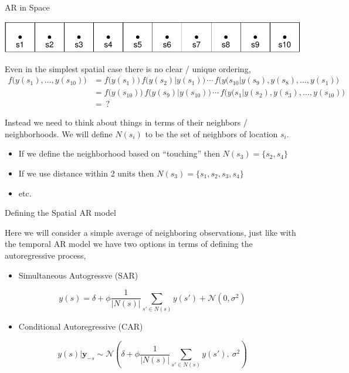 \documentclass[11pt,ignorenonframetext,]{beamer}
\providecommand{\tightlist}{%
  \setlength{\itemsep}{0pt}\setlength{\parskip}{0pt}}
\begin{document}
\begin{frame}[t]{AR in Space}

\vspace{4mm}

\includegraphics{Lec18_files/figure-beamer/unnamed-chunk-7-1.pdf}

\pause

Even in the simplest spatial case there is no clear / unique ordering,
\footnotesize
\[ \begin{aligned}
f\big(y(s_1), \ldots, y(s_{10})\big) 
  &= f\big(y(s_1)\big) \, f\big(y(s_2) | y(s_1)\big) \, \cdots \, f\big(y(s_{10} | y(s_{9}),y(s_{8}),\ldots,y(s_1)\big)  \\
  &= f\big(y(s_{10})\big) \, f\big(y(s_9) | y(s_{10})\big) \, \cdots \, f\big(y(s_{1} | y(s_{2}),y(s_{3}),\ldots,y(s_{10})\big)  \\
  &= ~?
\end{aligned} \] \normalsize

\pause

Instead we need to think about things in terms of their neighbors /
neighborhoods. We will define \(N(s_i)\) to be the set of neighbors of
location \(s_i\).

\begin{itemize}
\item
  If we define the neighborhood based on ``touching'' then
  \(N(s_3) = \{s_2, s_4\}\)
\item
  If we use distance within 2 units then
  \(N(s_3) = \{s_1,s_2,s_3,s_4\}\)
\item
  etc.
\end{itemize}

\end{frame}

\begin{frame}[t]{Defining the Spatial AR model}

Here we will consider a simple average of neighboring observations, just
like with the temporal AR model we have two options in terms of defining
the autoregressive process,

\begin{itemize}
\tightlist
\item
  Simultaneous Autogressve (SAR)
\end{itemize}

\[ y(s) = \delta + \phi \frac{1}{|N(s)|}\sum_{s' \in N(s)} y(s') + \mathcal{N}(0,\sigma^2) \]

\begin{itemize}
\tightlist
\item
  Conditional Autoregressive (CAR)
\end{itemize}

\[ y(s)|\bm{y}_{-s} \sim \mathcal{N}\left(\delta + \phi \frac{1}{|N(s)|}\sum_{s' \in N(s)} y(s'),~ \sigma^2 \right) \]

\end{frame}
\end{document}
